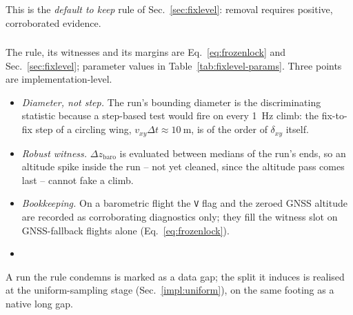 This is the \emph{default to keep} rule of Sec.~\ref{sec:fixlevel}: removal requires
positive, corroborated evidence.

\subsubsection{}
\begin{flowblock}
The rule, its witnesses and its margins are Eq.~\eqref{eq:frozenlock} and
Sec.~\ref{sec:fixlevel}; parameter values in Table~\ref{tab:fixlevel-params}. Three
points are implementation-level.
\begin{itemize}[itemsep=2pt, topsep=3pt]
  \item \emph{Diameter, not step.} The run's bounding diameter is the discriminating
        statistic because a step-based test would fire on every \SI{1}{\hertz} climb:
        the fix-to-fix step of a circling wing, $v_{xy}\Delta t\approx\SI{10}{\metre}$,
        is of the order of $\delta_{xy}$ itself.
  \item \emph{Robust witness.} $\Delta z_{\mathrm{baro}}$ is evaluated between medians
        of the run's ends, so an altitude spike inside the run -- not yet cleaned, since
        the altitude pass comes last -- cannot fake a climb.
  \item \emph{Bookkeeping.} On a barometric flight the \texttt{V} flag and the zeroed
        GNSS altitude are recorded as corroborating diagnostics only; they fill the
        witness slot on GNSS-fallback flights alone (Eq.~\eqref{eq:frozenlock}).
  \item {}
\end{itemize}
A run the rule condemns is marked as a data gap; the split it induces is realised at the
uniform-sampling stage (Sec.~\ref{impl:uniform}), on the same footing as a native long
gap.


\end{flowblock}
